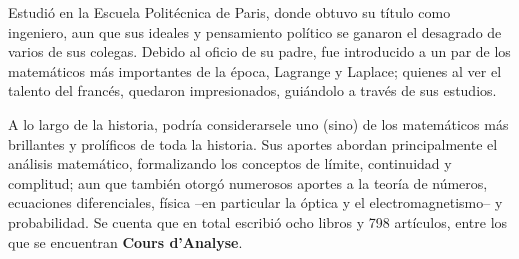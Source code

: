 \documentclass[11pt,oneside,a4paper]{book}
\begin{document}
Estudió en la Escuela Politécnica de Paris, donde obtuvo su título como ingeniero, aun que sus ideales y pensamiento político se ganaron el desagrado de varios de sus colegas. Debido al oficio de su padre, fue introducido a un par de los matemáticos más importantes de la época, Lagrange y Laplace; quienes al ver el talento del francés, quedaron impresionados, guiándolo a través de sus estudios.

A lo largo de la historia, podría considerarsele uno (sino) de los matemáticos más brillantes y prolíficos de toda la historia. Sus aportes abordan principalmente el análisis matemático, formalizando los conceptos de límite, continuidad y complitud; aun que también otorgó numerosos aportes a la teoría de números, ecuaciones diferenciales, física --en particular la óptica y el electromagnetismo-- y probabilidad. Se cuenta que en total escribió ocho libros y 798 artículos, entre los que se encuentran \textbf{Cours d'Analyse}.


\nocite{*}
\printbibliography
\end{document}
